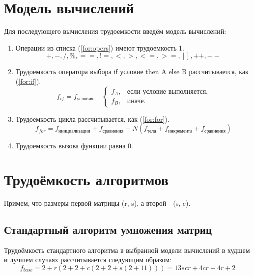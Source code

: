 \documentclass[12pt]{report}
\begin{document}
\section{Модель вычислений}

Для последующего вычисления трудоемкости введём модель вычислений:

\begin{enumerate}
	\item Операции из списка (\ref{for:opers}) имеют трудоемкость 1.
	\begin{equation}
		\label{for:opers}
		+, -, /, \%, ==, !=, <, >, <=, >=, [], ++, {-}-
	\end{equation}
	\item Трудоемкость оператора выбора if условие then A else B рассчитывается, как (\ref{for:if}).
	\begin{equation}
		\label{for:if}
		f_{if} = f_{\text{условия}} +
		\begin{cases}
			f_A, & \text{если условие выполняется,}\\
			f_B, & \text{иначе.}
		\end{cases}
	\end{equation}
	\item Трудоемкость цикла рассчитывается, как (\ref{for:for}).
	\begin{equation}
		\label{for:for}
		f_{for} = f_{\text{инициализации}} + f_{\text{сравнения}} + N(f_{\text{тела}} + f_{\text{инкремента}} + f_{\text{сравнения}})
	\end{equation}
	\item Трудоемкость вызова функции равна 0.
\end{enumerate}

\section{Трудоёмкость алгоритмов}
Примем, что размеры первой матрицы (r, s), а второй - (s, c).
\subsection{Стандартный алгоритм умножения матриц}

Трудоёмкость стандартного алгоритма в выбранной модели вычислений в худшем и лучшем случаях рассчитывается следующим образом:
\begin{equation}
	f_{base} = 2 + r(2 + 2 + c(2 + 2 + s(2 + 11))) = 13scr + 4cr + 4r + 2
\end{equation}
\end{document}
